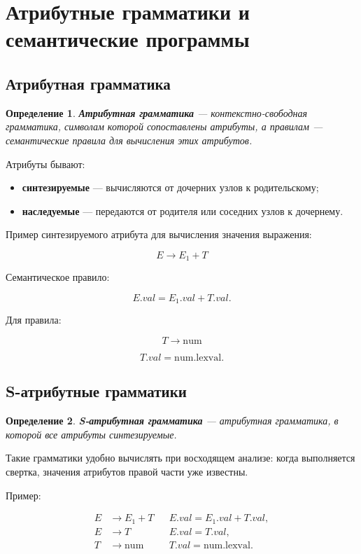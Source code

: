 \documentclass[12pt,a4paper]{article}
\newtheorem{definition}{Определение}
\begin{document}
\section{Атрибутные грамматики и семантические программы}

\subsection{Атрибутная грамматика}

\begin{definition}
\textbf{Атрибутная грамматика} --- контекстно-свободная грамматика, символам которой сопоставлены атрибуты, а правилам --- семантические правила для вычисления этих атрибутов.
\end{definition}

Атрибуты бывают:

\begin{itemize}
    \item \textbf{синтезируемые} --- вычисляются от дочерних узлов к родительскому;
    \item \textbf{наследуемые} --- передаются от родителя или соседних узлов к дочернему.
\end{itemize}

Пример синтезируемого атрибута для вычисления значения выражения:

\[
E \to E_1 + T
\]

Семантическое правило:

\[
E.val = E_1.val + T.val.
\]

Для правила:

\[
T \to \mathrm{num}
\]

\[
T.val = \mathrm{num.lexval}.
\]

\subsection{S-атрибутные грамматики}

\begin{definition}
\textbf{S-атрибутная грамматика} --- атрибутная грамматика, в которой все атрибуты синтезируемые.
\end{definition}

Такие грамматики удобно вычислять при восходящем анализе: когда выполняется свертка, значения атрибутов правой части уже известны.

Пример:

\[
\begin{aligned}
E &\to E_1 + T
    && E.val = E_1.val + T.val,\\
E &\to T
    && E.val = T.val,\\
T &\to \mathrm{num}
    && T.val = \mathrm{num.lexval}.
\end{aligned}
\]
\end{document}
